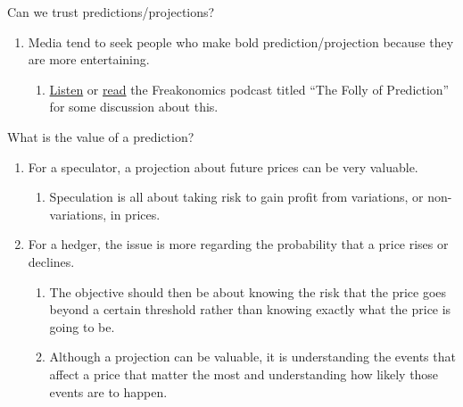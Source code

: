 \documentclass[table,xcolor=pdftex,dvipsnames, handout]{beamer}\usepackage[]{graphicx}\usepackage[]{color}
\begin{document}
\begin{frame}[allowframebreaks]{Can we trust predictions/projections?}
\begin{enumerate}[label=\textbullet]
        \begin{enumerate}[label=-]
         \item Someone who made a correct prediction will brag about it while someone who made a wrong prediction will keep quiet.
         \item There is little to no punishment to those who make wrong predictions while a correct prediction may receive a lot of press coverage.
         \end{enumerate}
  \item Media tend to seek people who make bold prediction/projection because they are more entertaining.
    \begin{enumerate}[label=-]
        \item \href{http://www.freakonomics.com/2011/09/14/new-freakonomics-radio-podcast-the-folly-of-prediction/}{Listen} or \href{http://www.freakonomics.com/2011/06/30/the-folly-of-prediction-full-transcript/}{read} the Freakonomics podcast titled ``The Folly of Prediction'' for some discussion about this.
      \end{enumerate}
\end{enumerate}
\end{frame}


\begin{frame}{What is the value of a prediction?}
\begin{enumerate}[label=\textbullet]
  \item For a speculator, a projection about future prices can be very valuable.
        \begin{enumerate}[label=-]
            \item Speculation is all about taking risk to gain profit from variations, or non-variations, in prices.
        \end{enumerate}
  \item For a hedger, the issue is more regarding the probability that a price rises or declines.
        \begin{enumerate}[label=-]
            \item The objective should then be about knowing the risk that the price goes beyond a certain threshold rather than knowing exactly what the price is going to be.
            \item Although a projection can be valuable, it is understanding the events that affect a price that matter the most and understanding how likely those events are to happen.
        \end{enumerate}
\end{enumerate}
\end{frame}
\end{document}
